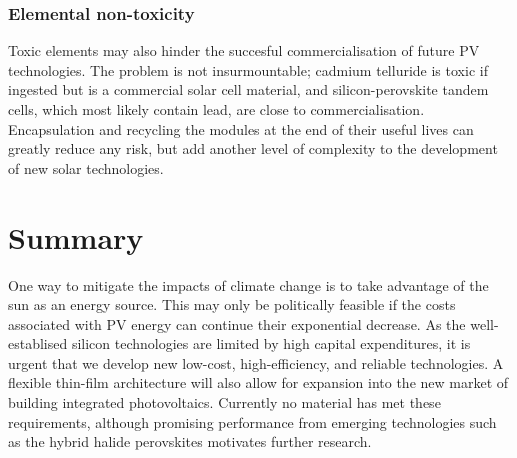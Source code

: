 \subsubsection{Elemental non-toxicity}
Toxic elements may also hinder the succesful commercialisation of future PV technologies. The problem is not insurmountable; cadmium telluride is toxic if ingested but is a commercial solar cell material, and silicon-perovskite tandem cells, which most likely contain lead, are close to commercialisation. Encapsulation and recycling the modules at the end of their useful lives can greatly reduce any risk, but add another level of complexity to the development of new solar technologies.

\section{Summary}

One way to mitigate the impacts of climate change is to take advantage of the sun as an energy source. This may only be politically feasible if the costs associated with PV energy can continue their exponential decrease. As the well-establised silicon technologies are limited by high capital expenditures, it is urgent that we develop new low-cost, high-efficiency, and reliable technologies. A flexible thin-film architecture will also allow for expansion into the new market of building integrated photovoltaics. Currently no material has met these requirements\autocite{Zakutayev2017}, although promising performance from emerging technologies such as the hybrid halide perovskites motivates further research.




